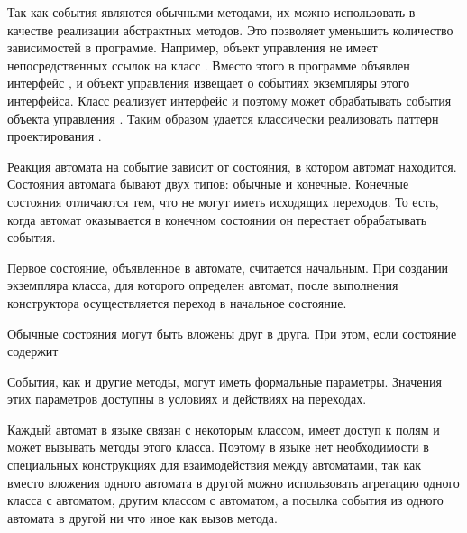 Так как события являются обычными методами, их можно использовать в качестве реализации абстрактных методов. Это позволяет
уменьшить количество зависимостей в программе. Например, объект управления  не имеет непосредственных
ссылок на класс . Вместо этого в программе объявлен интерфейс , и объект
управления  извещает о событиях экземпляры этого интерфейса. Класс  реализует интерфейс
 и поэтому может обрабатывать события объекта управления . Таким образом
удается классически реализовать паттерн проектирования  \cite{gof}.

Реакция автомата на событие зависит от состояния, в котором автомат находится. Состояния автомата бывают двух типов: обычные
и конечные. Конечные состояния отличаются тем, что не могут иметь исходящих переходов. То есть, когда автомат оказывается в
конечном состоянии он перестает обрабатывать события.

Первое состояние, объявленное в автомате, считается начальным. При создании экземпляра класса, для которого определен
автомат, после выполнения конструктора осуществляется переход в начальное состояние.

Обычные состояния могут быть вложены друг в друга. При этом, если состояние содержит

События, как и другие методы, могут иметь формальные параметры. Значения этих параметров доступны в условиях и действиях на
переходах.



Каждый автомат в языке  связан с некоторым классом, имеет доступ к полям и может вызывать методы этого
класса. Поэтому в языке  нет необходимости в специальных конструкциях для взаимодействия между
автоматами, так как вместо вложения одного автомата в другой можно использовать агрегацию одного класса с автоматом, другим
классом с автоматом, а посылка события из одного автомата в другой ни что иное как вызов метода.